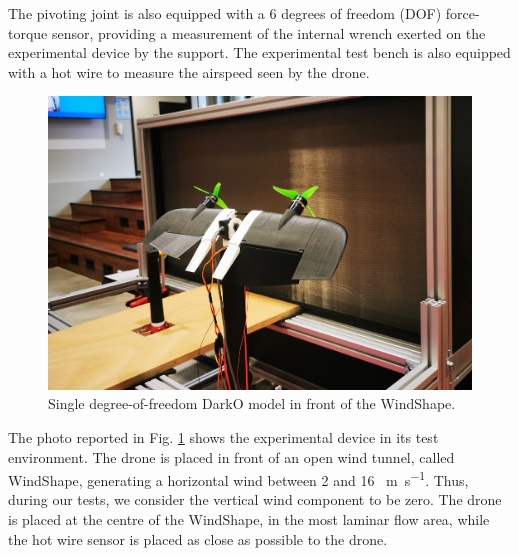 The pivoting joint is also equipped with a 6 degrees of freedom (DOF) force-torque sensor, providing a measurement of the internal wrench exerted on the experimental device by the support. The experimental test bench is also equipped with a hot wire to measure the airspeed seen by the drone. 

\begin{figure}[!ht]
    \includegraphics[trim=0cm 5cm 0cm 6cm,clip,width=1\columnwidth]{figures/real_test_bench-min.jpg}
    \caption{Single degree-of-freedom DarkO model in front of the WindShape.}
    \label{fig:real_test_bench}
\end{figure}
The photo reported in Fig. \ref{fig:real_test_bench} shows the experimental device in its test environment. The drone is placed in front of an open wind tunnel, called WindShape, generating a horizontal wind between 2 and 16 \SI{}{\meter\per\second}. Thus, during our tests, we consider the vertical wind component to be zero. The drone is placed at the centre of the WindShape, in the most laminar flow area, while the hot wire sensor is placed as close as possible to the drone. 

